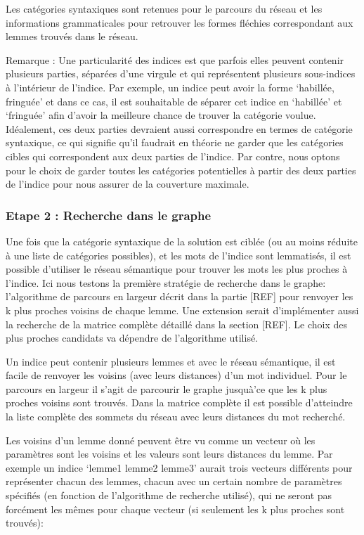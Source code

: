 {Les catégories syntaxiques sont retenues pour le parcours du réseau et les informations grammaticales pour retrouver les formes fléchies correspondant aux lemmes trouvés dans le réseau.

Remarque : Une particularité des indices est que parfois elles peuvent contenir plusieurs parties, séparées d'une virgule et qui représentent plusieurs sous-indices à l'intérieur de l'indice. Par exemple, un indice peut avoir la forme \lq{habillée, fringuée}\rq{} et dans ce cas, il est souhaitable de séparer cet indice en \lq{habillée}\rq{} et \lq{fringuée}\rq{} afin d'avoir la meilleure chance de trouver la catégorie voulue. Idéalement, ces deux parties devraient aussi correspondre en termes de catégorie syntaxique, ce qui signifie qu'il faudrait en théorie ne garder que les catégories cibles qui correspondent aux deux parties de l'indice. Par contre, nous optons pour le choix de garder toutes les catégories potentielles à partir des deux parties de l'indice pour nous assurer de la couverture maximale. 

\subsubsection{Etape 2 : Recherche dans le graphe}\label{sec:crossetape2}

Une fois que la catégorie syntaxique de la solution est ciblée (ou au moins réduite à une liste de catégories possibles), et les mots de l'indice sont lemmatisés, il est possible d'utiliser le réseau sémantique pour trouver les mots les plus proches à l'indice. Ici nous testons la première stratégie de recherche dans le graphe: l'algorithme de parcours en largeur décrit dans la partie [REF] pour renvoyer les k plus proches voisins de chaque lemme. Une extension serait d'implémenter aussi la recherche de la matrice complète détaillé dans la section [REF]. Le choix des plus proches candidats va dépendre de l'algorithme utilisé.

Un indice peut contenir plusieurs lemmes et avec le réseau sémantique, il est facile de renvoyer les voisins (avec leurs distances) d'un mot individuel. Pour le parcours en largeur il s'agit de parcourir le graphe jusquà'ce que les k plus proches voisins sont trouvés. Dans la matrice complète il est possible d'atteindre la liste complète des sommets du réseau avec leurs distances du mot recherché. 

Les voisins d'un lemme donné peuvent être vu comme un vecteur où les paramètres sont les voisins et les valeurs sont leurs distances du lemme. Par exemple un indice \lq{lemme1 lemme2 lemme3}\rq{} aurait trois vecteurs différents pour représenter chacun des lemmes, chacun avec un certain nombre de paramètres spécifiés (en fonction de l'algorithme de recherche utilisé), qui ne seront pas forcément les mêmes pour chaque vecteur (si seulement les k plus proches sont trouvés):

}
